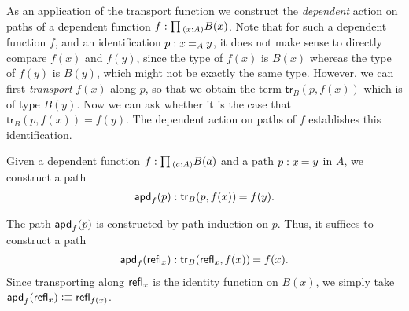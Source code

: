 As an application of the transport function we construct the \emph{dependent} action on paths of a dependent function $f:\prd{x:A}B(x)$. Note that for such a dependent function $f$, and an identification $p:\id[A]{x}{y}$, it does not make sense to directly compare $f(x)$ and $f(y)$, since the type of $f(x)$ is $B(x)$ whereas the type of $f(y)$ is $B(y)$, which might not be exactly the same type. However, we can first \emph{transport} $f(x)$ along $p$, so that we obtain the term $\mathsf{tr}_B(p,f(x))$ which is of type $B(y)$. Now we can ask whether it is the case that $\mathsf{tr}_B(p,f(x))=f(y)$. The dependent action on paths of $f$ establishes this identification.

\begin{defn}\label{defn:apd}
Given a dependent function $f:\prd{a:A}B(a)$ and a path $p:\id{x}{y}$ in $A$, we construct a path
\begin{equation*}
\apd{f}{p} : \id{\mathsf{tr}_B(p,f(x))}{f(y)}.
\end{equation*}
\end{defn}

\begin{constr}
The path $\mathsf{apd}_{f}\mathopen{}\left(p\right)\mathclose{}$ is constructed by path induction on $p$. Thus, it suffices to construct a path
\begin{equation*}
\apd{f}{\refl{x}}:\id{\mathsf{tr}_B(\refl{x},f(x))}{f(x)}.
\end{equation*}
Since transporting along $\mathsf{refl}_{x}$ is the identity function on $B(x)$, we simply take $\mathsf{apd}_{f}\mathopen{}\left(\mathsf{refl}_{x}\right)\mathclose{}\vcentcolon\equiv\mathsf{refl}_{f(x)}$. 
\end{constr}

%

